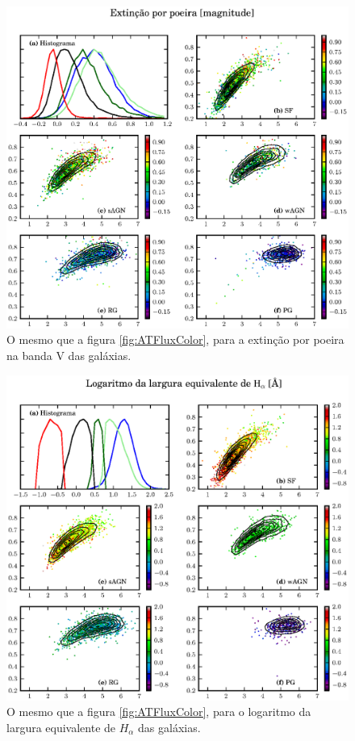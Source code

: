 \begin{figure}
	\includegraphics{figuras/uvcolor-color-AV-byclass.eps}
	\caption[Absorção por poeira no diagrama cor--cor UV.]
	{O mesmo que a figura \ref{fig:ATFluxColor}, para a extinção por
	poeira na banda V das galáxias.}
	\label{fig:AVColor}
\end{figure}

\begin{figure}
	\includegraphics{figuras/uvcolor-color-halpha_ew-byclass.eps}
	\caption[Largura equivalente de $H_{\alpha}$ no diagrama cor--cor UV.]
	{O mesmo que a figura \ref{fig:ATFluxColor}, para o logaritmo da largura
	equivalente de $H_{\alpha}$ das galáxias.}
	\label{fig:EWHaColor}
\end{figure}



